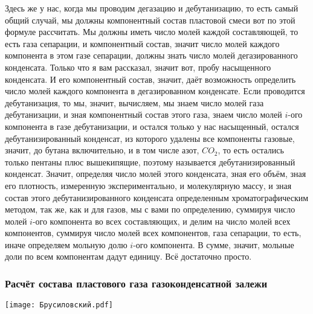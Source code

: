 \documentclass[main.tex]{subfiles}
\begin{document}
Здесь же у нас, когда мы проводим дегазацию и дебутанизацию, то есть самый общий случай, мы должны компонентный состав пластовой смеси вот по этой формуле рассчитать.
Мы должны иметь число молей каждой составляющей, то есть газа сепарации, и компонентный состав, значит число молей каждого компонента в этом газе сепарации, должны знать число молей дегазированного конденсата.
Только что я вам рассказал, значит вот, пробу насыщенного конденсата.
И его компонентный состав, значит, даёт возможность определить число молей каждого компонента в дегазированном конденсате.
Если проводится дебутанизация, то мы, значит, вычисляем, мы знаем число молей газа дебутанизации, и зная компонентный состав этого газа, знаем число молей $i$-ого компонента в газе дебутанизации, и остался только у нас насыщенный, остался дебутанизированный конденсат, из которого удалены все компоненты газовые, значит, до бутана включительно, и в том числе азот, $CO_2$, то есть остались только пентаны плюс вышекипящие, поэтому называется дебутанизированный конденсат.
Значит, определяя число молей этого конденсата, зная его объём, зная его плотность, измеренную экспериментально, и молекулярную массу, и зная состав этого дебутанизированного конденсата определенным хроматографическим методом, так же, как и для газов, мы с вами по определению, суммируя число молей $i$-ого компонента во всех составляющих, и делим на число молей всех компонентов, суммируя число молей всех компонентов, газа сепарации, то есть, иначе определяем мольную долю $i$-ого компонента.
В сумме, значит, мольные доли по всем компонентам дадут единицу.
Всё достаточно просто.

\subsubsection{Расчёт состава пластового газа газоконденсатной залежи}

\begin{center}
\texttt{[image: Брусиловский.pdf]}
\end{center}
\end{document}
